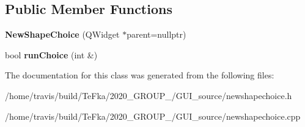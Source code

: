 \subsection*{Public Member Functions}
\begin{DoxyCompactItemize}
\item 
{\bfseries New\+Shape\+Choice} (Q\+Widget $\ast$parent=nullptr)\hypertarget{class_new_shape_choice_a8fd6fbdd0fe0ac1a250729389d656247}{}\label{class_new_shape_choice_a8fd6fbdd0fe0ac1a250729389d656247}

\item 
bool {\bfseries run\+Choice} (int \&)\hypertarget{class_new_shape_choice_a0ad3ab9d4e869400468e1f2a758e22e4}{}\label{class_new_shape_choice_a0ad3ab9d4e869400468e1f2a758e22e4}

\end{DoxyCompactItemize}


The documentation for this class was generated from the following files\+:\begin{DoxyCompactItemize}
\item 
/home/travis/build/\+Te\+Fka/2020\+\_\+\+G\+R\+O\+U\+P\+\_/\+G\+U\+I\+\_\+source/newshapechoice.\+h\item 
/home/travis/build/\+Te\+Fka/2020\+\_\+\+G\+R\+O\+U\+P\+\_/\+G\+U\+I\+\_\+source/newshapechoice.\+cpp\end{DoxyCompactItemize}
